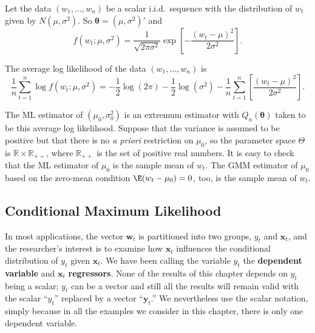 \begin{example}
\label{ex:7.1}
Let the data $(w_1, \ldots, w_n)$ be a scalar i.i.d.\ sequence with the distribution of $w_t$ given by $N(\mu, \sigma^2)$. So $\bm{\theta} = (\mu, \sigma^2)'$ and
\[
f(w_t; \mu, \sigma^2) = \frac{1}{\sqrt{2\pi\sigma^2}} \exp\left[ -\frac{(w_t - \mu)^2}{2\sigma^2} \right].
\]

The average log likelihood of the data $(w_1, \ldots, w_n)$ is
\begin{equation}
\label{eq:7.1.8}
\frac{1}{n} \sum_{t=1}^{n} \log f(w_t; \mu, \sigma^2) = -\frac{1}{2}\log(2\pi) - \frac{1}{2}\log(\sigma^2) - \frac{1}{n} \sum_{t=1}^{n} \left[ \frac{(w_t - \mu)^2}{2\sigma^2} \right].
\end{equation}

The ML estimator of $(\mu_0, \sigma_0^2)$ is an extremum estimator with $Q_n(\bm{\theta})$ taken to be this average log likelihood. Suppose that the variance is assumed to be positive but that there is no \emph{a priori} restriction on $\mu_0$, so the parameter space $\Theta$ is $\mathbb{R} \times \mathbb{R}_{++}$, where $\mathbb{R}_{++}$ is the set of positive real numbers. It is easy to check that the ML estimator of $\mu_0$ is the sample mean of $w_t$. The GMM estimator of $\mu_0$ based on the zero-mean condition $\E(w_t - \mu_0) = 0$, too, is the sample mean of $w_t$.
\end{example}

\subsection*{Conditional Maximum Likelihood}

In most applications, the vector $\mathbf{w}_t$ is partitioned into two groups, $y_t$ and $\mathbf{x}_t$, and the researcher's interest is to examine how $\mathbf{x}_t$ influences the conditional distribution of $y_t$ given $\mathbf{x}_t$. We have been calling the variable $y_t$ the \textbf{dependent variable} and $\mathbf{x}_t$ \textbf{regressors}. None of the results of this chapter depends on $y_t$ being a scalar; $y_t$ can be a vector and still all the results will remain valid with the scalar ``$y_t$'' replaced by a vector ``$\mathbf{y}_t$.'' We nevertheless use the scalar notation, simply because in all the examples we consider in this chapter, there is only one dependent variable.


